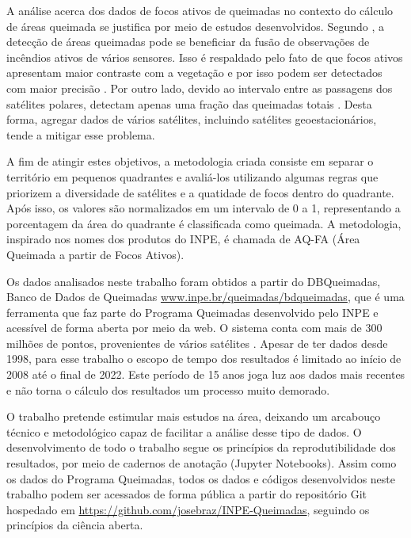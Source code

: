 \documentclass[cic,tc]{iiufrgs}
\begin{document}

A análise acerca dos dados de focos ativos de queimadas no contexto do cálculo de áreas queimada se justifica por meio de estudos desenvolvidos. Segundo \citet{giglio2010assessing}, a detecção de áreas queimadas pode se beneficiar da fusão de observações de incêndios ativos de vários sensores. Isso é respaldado pelo fato de que focos ativos apresentam maior contraste com a vegetação e por isso podem ser detectados com maior precisão \citep{GIGLIO2016}. Por outro lado, devido ao intervalo entre as passagens dos satélites polares, detectam apenas uma fração das queimadas totais \citep{HANTSON2013, giglio2009active}. Desta forma, agregar dados de vários satélites, incluindo satélites geoestacionários, tende a mitigar esse problema.


A fim de atingir estes objetivos, a metodologia criada consiste em separar o território em pequenos quadrantes e avaliá-los utilizando algumas regras que priorizem a diversidade de satélites e a quatidade de focos dentro do quadrante. Após isso, os valores são normalizados em um intervalo de 0 a 1, representando a porcentagem da área do quadrante é classificada como queimada. A metodologia, inspirado nos nomes dos produtos do INPE, é chamada de AQ-FA (Área Queimada a partir de Focos Ativos).

Os dados analisados neste trabalho foram obtidos a partir do DBQueimadas, Banco de Dados de Queimadas \url{www.inpe.br/queimadas/bdqueimadas}, que é uma ferramenta que faz parte do Programa Queimadas desenvolvido pelo INPE e acessível de forma aberta por meio da web. O sistema conta com mais de 300 milhões de pontos, provenientes de vários satélites \citep{setzer2019banco}. Apesar de ter dados desde 1998, para esse trabalho o escopo de tempo dos resultados é limitado ao início de 2008 até o final de 2022. Este período de 15 anos joga luz aos dados mais recentes e não torna o cálculo dos resultados um processo muito demorado.


O trabalho pretende estimular mais estudos na área, deixando um arcabouço técnico e metodológico capaz de facilitar a análise desse tipo de dados. O desenvolvimento de todo o trabalho segue os princípios da reprodutibilidade dos resultados, por meio de cadernos de anotação (Jupyter Notebooks). Assim como os dados do Programa Queimadas, todos os dados e códigos desenvolvidos neste trabalho podem ser acessados de forma pública a partir do repositório Git hospedado em \url{https://github.com/josebraz/INPE-Queimadas}, seguindo os princípios da ciência aberta. 
\end{document}
